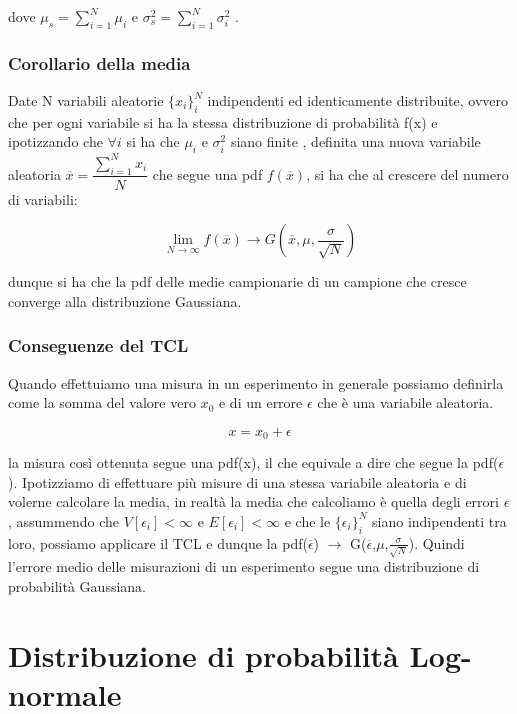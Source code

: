 \documentclass[11pt,a4paper]{book}
\begin{document}
dove $\mu_s =\sum_{i=1}^N \mu_i$ e $\sigma_s^2 = \sum_{i=1}^N \sigma^2_i$ .

\subsubsection{Corollario della media}

Date N variabili aleatorie $\{x_{i}\}_{i}^N$ indipendenti ed identicamente distribuite, ovvero che per ogni variabile si ha la stessa distribuzione di probabilit\`{a} f(x) e ipotizzando che $\forall i$ si ha che $\mu_i$ e $\sigma_i^2$ siano finite , definita una nuova variabile aleatoria $\overline{x} = \dfrac{\sum_{i=1}^N x_{i}}{N}$ che segue una pdf $f(\overline{x})$, si ha che al crescere del numero di variabili:

\begin{equation*}
	\lim_{N \rightarrow \infty} f(\overline{x}) \rightarrow G(\overline{x},\mu,\frac{\sigma}{\sqrt{N}})
\end{equation*}

dunque si ha che la pdf delle medie campionarie di un campione che cresce converge alla distribuzione Gaussiana.


\subsubsection{Conseguenze del TCL}

 Quando effettuiamo una misura in un esperimento in generale possiamo definirla come la somma del valore vero $x_0$ e di un errore $\epsilon$ che \`{e} una variabile aleatoria.
 
 \begin{equation*}
 	x = x_0 + \epsilon
 \end{equation*}

la misura cos\`{i} ottenuta segue una pdf(x), il che equivale a dire che segue la pdf($\epsilon$). Ipotizziamo di effettuare pi\`{u} misure di una stessa variabile aleatoria e di volerne calcolare la media, in realt\`{a} la media che calcoliamo \`{e} quella degli errori $\epsilon$, assummendo che $V[\epsilon_i] < \infty$ e $E[\epsilon_i] < \infty$ e che le $\{\epsilon_i\}_{i}^N$ siano indipendenti tra loro, possiamo applicare il TCL e dunque la  pdf($\overline{\epsilon}$) $\rightarrow$ G($\overline{\epsilon}$,$\mu$,$\frac{\sigma}{\sqrt{N}}$). Quindi l'errore medio delle misurazioni di un esperimento segue una distribuzione di probabilit\`{a} Gaussiana.

\section{Distribuzione di probabilit\`{a} Log-normale}
\end{document}

